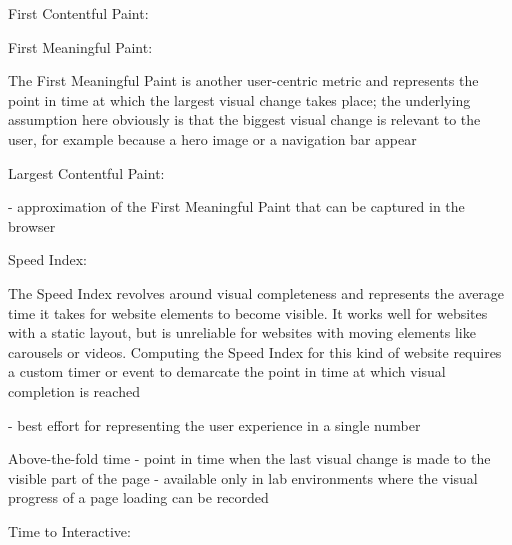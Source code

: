 First Contentful Paint: %



First Meaningful Paint: %

The First Meaningful Paint is another user-centric metric and represents the point in time at which the largest visual change takes place; the underlying assumption here obviously is that the biggest visual change is relevant to the user, for example because a hero image or a navigation bar appear





Largest Contentful Paint: %

- approximation of the First Meaningful Paint that can be captured in the browser




Speed Index: %

The Speed Index revolves around visual completeness and represents the average time it takes for website elements to become visible. It works well for websites with a static layout, but is unreliable for websites with moving elements like carousels or videos. Computing the Speed Index for this kind of website requires a custom timer or event to demarcate the point in time at which visual completion is reached

- best effort for representing the user experience in a single number



Above-the-fold time %
- point in time when the last visual change is made to the visible part of the page
- available only in lab environments where the visual progress of a page loading can be recorded





Time to Interactive: %












